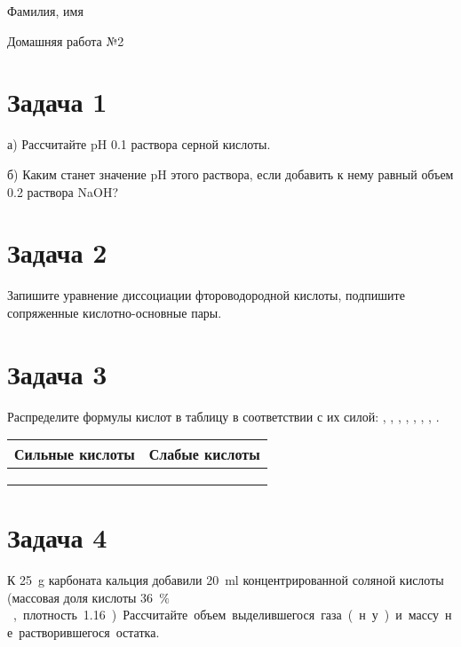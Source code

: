 \documentclass[a4paper,12pt]{article}
\begin{document}
\begin{minipage}[t]{\textwidth}
\vspace*{0pt} %
\leavevmode Фамилия, имя \hrulefill
\begin{center}
  \LARGE Домашняя работа №2
\end{center}
\end{minipage}

\setlength{\parindent}{15pt}
\section*{Задача 1}
а) Рассчитайте pH \SI{0.1}{\moleperliter} раствора серной кислоты.\par
\vspace{5\baselineskip}
б) Каким станет значение pH этого раствора, если добавить к нему равный объем \SI{0.2}{\moleperliter} раствора NaOH?\par
\vspace{5\baselineskip}
\section*{Задача 2}
Запишите уравнение диссоциации фтороводородной кислоты, подпишите сопряженные кислотно-основные пары.\par
\vspace{0.5\baselineskip}
{\centering{}\par}
\vspace*{2\baselineskip}
\section*{Задача 3}
Распределите формулы кислот в таблицу в соответствии с их силой: , , , , , , , .\par
\vspace{0.5\baselineskip}
\begin{tabularx}{\textwidth}{|Y|Y|}
\hline
Сильные кислоты & Слабые кислоты\\ 
\hline
 & \\ 
 & \\ 
& \\ 
\hline
\end{tabularx}

\section*{Задача 4}
К \SI{25}{\gram} карбоната кальция добавили \SI{20}{\ml} концентрированной соляной кислоты (массовая доля кислоты \SI{36}{$\%$}, плотность \SI{1.16}{\grampercm}). Рассчитайте объем выделившегося газа (н. у.) и массу не растворившегося остатка.
\end{document}
